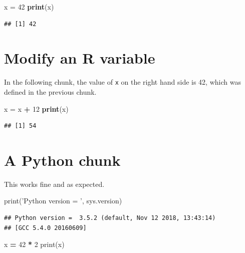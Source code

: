 \documentclass[]{book}
\newenvironment{Shaded}{\begin{snugshade}}{\end{snugshade}}
\newcommand{\BuiltInTok}[1]{#1}
\newcommand{\DecValTok}[1]{\textcolor[rgb]{0.00,0.00,0.81}{#1}}
\newcommand{\KeywordTok}[1]{\textcolor[rgb]{0.13,0.29,0.53}{\textbf{#1}}}
\newcommand{\NormalTok}[1]{#1}
\newcommand{\OperatorTok}[1]{\textcolor[rgb]{0.81,0.36,0.00}{\textbf{#1}}}
\newcommand{\StringTok}[1]{\textcolor[rgb]{0.31,0.60,0.02}{#1}}
\begin{document}
\begin{Shaded}
\begin{Highlighting}[]
\NormalTok{x =}\StringTok{ }\DecValTok{42}
\KeywordTok{print}\NormalTok{(x)}
\end{Highlighting}
\end{Shaded}

\begin{verbatim}
## [1] 42
\end{verbatim}

\hypertarget{modify-an-r-variable}{%
\section{Modify an R variable}\label{modify-an-r-variable}}

In the following chunk, the value of \texttt{x} on the right hand side
is 42, which was defined in the previous chunk.

\begin{Shaded}
\begin{Highlighting}[]
\NormalTok{x =}\StringTok{ }\NormalTok{x }\OperatorTok{+}\StringTok{ }\DecValTok{12}
\KeywordTok{print}\NormalTok{(x)}
\end{Highlighting}
\end{Shaded}

\begin{verbatim}
## [1] 54
\end{verbatim}

\hypertarget{a-python-chunk}{%
\section{A Python chunk}\label{a-python-chunk}}

This works fine and as expected.

\begin{Shaded}
\begin{Highlighting}[]
\BuiltInTok{print}\NormalTok{(}\StringTok{'Python version = '}\NormalTok{, sys.version)}
\end{Highlighting}
\end{Shaded}

\begin{verbatim}
## Python version =  3.5.2 (default, Nov 12 2018, 13:43:14) 
## [GCC 5.4.0 20160609]
\end{verbatim}

\begin{Shaded}
\begin{Highlighting}[]
\NormalTok{x }\OperatorTok{=} \DecValTok{42} \OperatorTok{*} \DecValTok{2}
\BuiltInTok{print}\NormalTok{(x) }
\end{Highlighting}
\end{Shaded}
\end{document}
